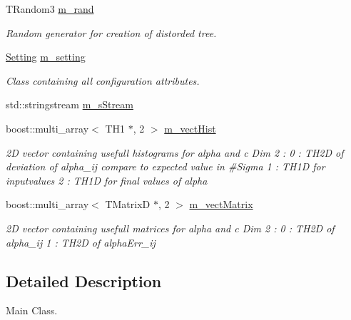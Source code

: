 \begin{DoxyCompactItemize}
\item 
T\+Random3 \hyperlink{classTemplateMethod_1_1Template_a163ee2f68cb0c91fc7d6923b33028183}{m\+\_\+rand}
\begin{DoxyCompactList}\small\item\em Random generator for creation of distorded tree. \end{DoxyCompactList}\item 
\hyperlink{classTemplateMethod_1_1Setting}{Setting} \hyperlink{classTemplateMethod_1_1Template_aa845b6e4b07ce986dfc6194a042f3547}{m\+\_\+setting}
\begin{DoxyCompactList}\small\item\em Class containing all configuration attributes. \end{DoxyCompactList}\item 
std\+::stringstream \hyperlink{classTemplateMethod_1_1Template_a933478f89782a5046a2e440d087029fa}{m\+\_\+s\+Stream}
\item 
boost\+::multi\+\_\+array$<$ T\+H1 $\ast$, 2 $>$ \hyperlink{classTemplateMethod_1_1Template_a9a70b763c4c2f3c4c67bb29bc0aedc01}{m\+\_\+vect\+Hist}
\begin{DoxyCompactList}\small\item\em 2\+D vector containing usefull histograms for alpha and c Dim 2 \+: 0 \+: T\+H2\+D of deviation of alpha\+\_\+ij compare to expected value in \#\+Sigma 1 \+: T\+H1\+D for inputvalues 2 \+: T\+H1\+D for final values of alpha \end{DoxyCompactList}\item 
boost\+::multi\+\_\+array$<$ T\+Matrix\+D $\ast$, 2 $>$ \hyperlink{classTemplateMethod_1_1Template_a3aa8dfbdcf19ebb9eab160327fe6f804}{m\+\_\+vect\+Matrix}
\begin{DoxyCompactList}\small\item\em 2\+D vector containing usefull matrices for alpha and c Dim 2 \+: 0 \+: T\+H2\+D of alpha\+\_\+ij 1 \+: T\+H2\+D of alpha\+Err\+\_\+ij \end{DoxyCompactList}\end{DoxyCompactItemize}


\subsection{Detailed Description}
Main Class. 

